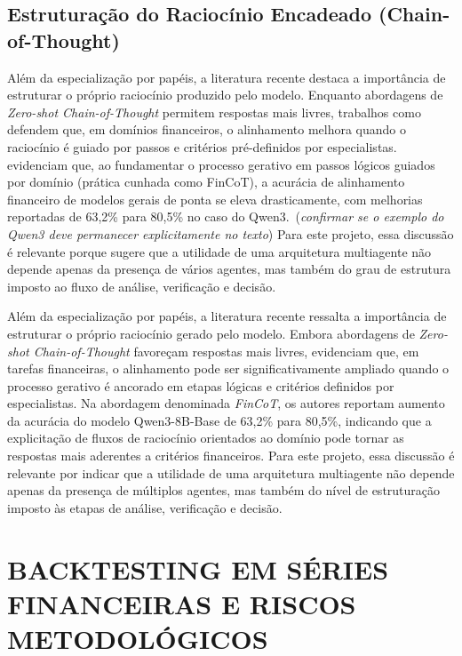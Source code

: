\documentclass{eic-bcc-tcc}
\newcommand{\remarks}[2]{{\color{red} #1\ (\textit{#2})}}
\begin{document}
\subsection{Estruturação do Raciocínio Encadeado (Chain-of-Thought)}

Além da especialização por papéis, a literatura recente destaca a importância de estruturar o próprio raciocínio produzido pelo modelo. Enquanto abordagens de \textit{Zero-shot Chain-of-Thought} permitem respostas mais livres, trabalhos como \citet{FinCoT2026} defendem que, em domínios financeiros, o alinhamento melhora quando o raciocínio é guiado por passos e critérios pré-definidos por especialistas. \remarks{\citet[p. 1]{FinCoT2026} evidenciam que, ao fundamentar o processo gerativo em passos lógicos guiados por domínio (prática cunhada como FinCoT), a acurácia de alinhamento financeiro de modelos gerais de ponta se eleva drasticamente, com melhorias reportadas de 63,2\% para 80,5\% no caso do Qwen3.}{confirmar se o exemplo do Qwen3 deve permanecer explicitamente no texto} Para este projeto, essa discussão é relevante porque sugere que a utilidade de uma arquitetura multiagente não depende apenas da presença de vários agentes, mas também do grau de estrutura imposto ao fluxo de análise, verificação e decisão.


Além da especialização por papéis, a literatura recente ressalta a importância de estruturar o próprio raciocínio gerado pelo modelo. Embora abordagens de \textit{Zero-shot Chain-of-Thought} favoreçam respostas mais livres, \citet[p. 1]{FinCoT2026}  evidenciam que, em tarefas financeiras, o alinhamento pode ser significativamente ampliado quando o processo gerativo é ancorado em etapas lógicas e critérios definidos por especialistas. Na abordagem denominada \textit{FinCoT}, os autores reportam aumento da acurácia do modelo Qwen3-8B-Base de 63,2\% para 80,5\%, indicando que a explicitação de fluxos de raciocínio orientados ao domínio pode tornar as respostas mais aderentes a critérios financeiros. Para este projeto, essa discussão é relevante por indicar que a utilidade de uma arquitetura multiagente não depende apenas da presença de múltiplos agentes, mas também do nível de estruturação imposto às etapas de análise, verificação e decisão.


\section{BACKTESTING EM SÉRIES FINANCEIRAS E RISCOS METODOLÓGICOS}
\end{document}
